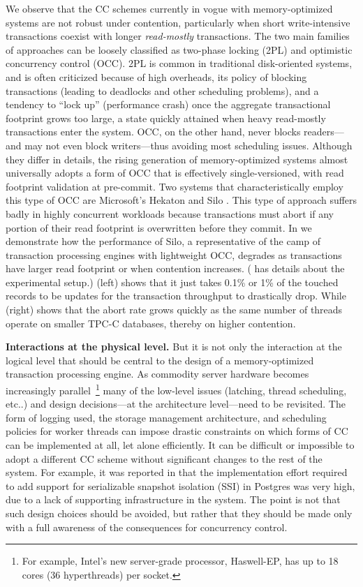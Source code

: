 We observe that the CC schemes currently in vogue with memory-optimized systems are not robust under contention, particularly when short write-intensive transactions coexist with longer \textit{read-mostly} transactions.
The two main families of approaches can be loosely classified as two-phase locking (2PL) and optimistic concurrency control (OCC). 2PL is common in traditional disk-oriented systems, and is often criticized because of high overheads, its policy of blocking transactions (leading to deadlocks and other scheduling problems), and a tendency to ``lock up'' (performance crash) once the aggregate transactional footprint grows too large, a state quickly attained when heavy read-mostly transactions enter the system. OCC, on the other hand, never blocks readers---and may not even block writers---thus avoiding most scheduling issues. Although they differ in details, the rising generation of memory-optimized systems almost universally adopts a form of OCC that is effectively single-versioned, with read footprint validation at pre-commit.  Two systems that characteristically employ this type of OCC are Microsoft's Hekaton \cite{LarsonBDFPZ11} and Silo \cite{TuZKLM13}. This type of approach suffers badly in highly concurrent workloads \cite{YuBPDS14} because transactions must abort if any portion of their read footprint is overwritten before they commit. 
In  we demonstrate how the performance of Silo, a representative of the camp of transaction processing engines with lightweight OCC, degrades as transactions have larger read footprint or when contention increases. ( has details about the experimental setup.) (left) shows that it just takes 0.1\% or 1\% of the touched records to be updates for the transaction throughput to drastically drop. While (right) shows that the abort rate grows quickly as the same number of threads operate on smaller TPC-C databases, thereby on higher contention.


\vspace{2mm}
{\bf Interactions at the physical level.} 
But it is not only the interaction at the logical level that should be central to the design of a memory-optimized transaction processing engine. As commodity server hardware becomes increasingly parallel~\footnote{For example, Intel's new server-grade processor, Haswell-EP, has up to 18 cores (36 hyperthreads) per socket.} many of the low-level issues (latching, thread scheduling, etc..) and design decisions---at the architecture level---need to be revisited. The form of logging used, the storage management architecture, and scheduling policies for worker threads can impose drastic constraints on which forms of CC can be implemented at all, let alone efficiently. 
It can be difficult or impossible to adopt a different CC scheme without significant changes to the rest of the system. 
For example, it was reported in \cite{PortsG12} that the implementation effort required to add support for serializable snapshot isolation (SSI) in Postgres was very high, due to a lack of supporting infrastructure in the system. 
The point is not that such design choices should be avoided, but rather that they should be made only with a full awareness of the consequences for concurrency control. 

